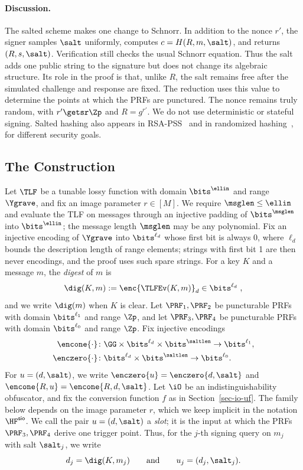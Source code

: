 \paragraph*{Discussion.} The salted scheme makes one change to Schnorr. In addition to the nonce $r'$, the signer samples $\salt$ uniformly, computes $c=H(R,m,\salt)$, and returns $(R,s,\salt)$. Verification still checks the usual Schnorr equation. Thus the salt adds one public string to the signature but does not change its algebraic structure. Its role in the proof is that, unlike $R$, the salt remains free after the simulated challenge and response are fixed. The reduction uses this value to determine the points at which the PRFs are punctured. The nonce remains truly random, with $r'\getsr\Zp$ and $R=g^{r'}$. We do not use deterministic or stateful signing. Salted hashing also appears in RSA-PSS~\cite{EC:BelRog96} and in randomized hashing~\cite{C:HalKra06}, for different security goals.

\subsection{The Construction} \label{sec-salted-constr}

Let $\TLF$ be a tunable lossy function with domain $\bits^{\ellin}$ and range $\Ygrave$, and fix an image parameter $r\in[M]$. We require $\msglen\le\ellin$ and evaluate the TLF on messages through an injective padding of $\bits^{\msglen}$ into $\bits^{\ellin}$; the message length $\msglen$ may be any polynomial. Fix an injective encoding of $\Ygrave$ into $\bits^{\ell_d}$ whose first bit is always 0, where $\ell_d$ bounds the description length of range elements; strings with first bit 1 are then never encodings, and the proof uses such spare strings. For a key $K$ and a message $m$, the \emph{digest} of $m$ is
$$
\dig(K,m) := \enc{\TLFEv(K,m)}_d \in \bits^{\ell_d} \;,
$$
and we write $\dig(m)$ when $K$ is clear. Let $\PRF_1,\PRF_2$ be puncturable PRFs with domain $\bits^{\ell_1}$ and range $\Zp$, and let $\PRF_3,\PRF_4$ be puncturable PRFs with domain $\bits^{\ell_0}$ and range $\Zp$. Fix injective encodings
$$
\begin{aligned}
\encone{\cdot}&\colon\GG\times\bits^{\ell_d}\times\bits^{\saltlen}\to\bits^{\ell_1},\\
\enczero{\cdot}&\colon\bits^{\ell_d}\times\bits^{\saltlen}\to\bits^{\ell_0}.
\end{aligned}
$$
For $u=(d,\salt)$, we write $\enczero{u}=\enczero{d,\salt}$ and $\encone{R,u}=\encone{R,d,\salt}$. Let $\iO$ be an indistinguishability obfuscator, and fix the conversion function $f$ as in Section~\ref{sec-io-uf}. The family below depends on the image parameter $r$, which we keep implicit in the notation $\HF^{\mathsf{sio}}$. We call the pair $u=(d,\salt)$ a \emph{slot}; it is the input at which the PRFs $\PRF_3,\PRF_4$ derive one trigger point. Thus, for the $j$-th signing query on $m_j$ with salt $\salt_j$, we write
$$
d_j=\dig(K,m_j)
\qquad\text{and}\qquad
u_j=(d_j,\salt_j).
$$

